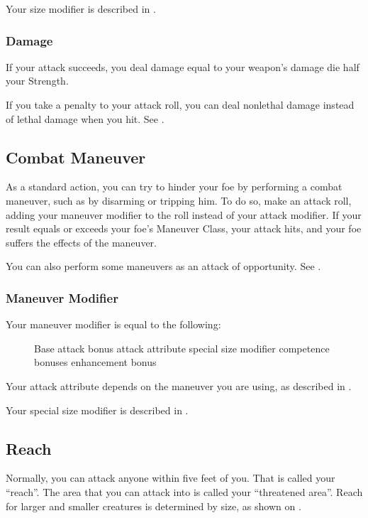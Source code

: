 Your size modifier is described in .

\subsubsection{Damage}
If your attack succeeds, you deal damage equal to your weapon's damage die \add half your Strength.

 If you take a  penalty to your attack roll, you can deal nonlethal damage instead of lethal damage when you hit. See .

\subsection{Combat Maneuver}\label{Combat Maneuver}
As a standard action, you can try to hinder your foe by performing a combat maneuver, such as by disarming or tripping him. To do so, make an attack roll, adding your maneuver modifier to the roll instead of your attack modifier. If your result equals or exceeds your foe's Maneuver Class, your attack hits, and your foe suffers the effects of the maneuver.

You can also perform some maneuvers as an attack of opportunity. See .

\subsubsection{Maneuver Modifier}
Your maneuver modifier is equal to the following:

\begin{figure}[h]
\centering Base attack bonus \add attack attribute \add special size modifier \add competence bonuses \add enhancement bonus
\end{figure}

Your attack attribute depends on the maneuver you are using, as described in .

Your special size modifier is described in .

\subsection{Reach}
Normally, you can attack anyone within five feet of you. That is called your ``reach''. The area that you can attack into is called your ``threatened area''. Reach for larger and smaller creatures is determined by size, as shown on .


